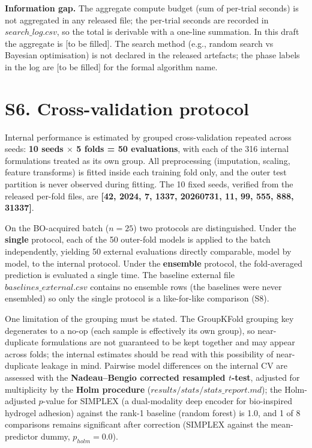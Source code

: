 \documentclass[utf8]{frontiers_suppmat}
\begin{document}
\textbf{Information gap.} The aggregate compute budget (sum of per-trial seconds) is not aggregated in any released file; the per-trial seconds are recorded in $search\_log.csv$, so the total is derivable with a one-line summation. In this draft the aggregate is {[}to be filled{]}. The search method (e.g., random search vs Bayesian optimisation) is not declared in the released artefacts; the phase labels in the log are {[}to be filled{]} for the formal algorithm name.

\section{S6. Cross-validation protocol}

Internal performance is estimated by grouped cross-validation repeated across seeds: \textbf{10 seeds $\times$ 5 folds = 50 evaluations}, with each of the 316 internal formulations treated as its own group. All preprocessing (imputation, scaling, feature transforms) is fitted inside each training fold only, and the outer test partition is never observed during fitting. The 10 fixed seeds, verified from the released per-fold files, are \textbf{[42, 2024, 7, 1337, 20260731, 11, 99, 555, 888, 31337]}.

On the BO-acquired batch ($n = 25$) two protocols are distinguished. Under the \textbf{single} protocol, each of the 50 outer-fold models is applied to the batch independently, yielding 50 external evaluations directly comparable, model by model, to the internal protocol. Under the \textbf{ensemble} protocol, the fold-averaged prediction is evaluated a single time. The baseline external file $baselines\_external.csv$ contains no ensemble rows (the baselines were never ensembled) so only the single protocol is a like-for-like comparison (S8).

One limitation of the grouping must be stated. The GroupKFold grouping key degenerates to a no-op (each sample is effectively its own group), so near-duplicate formulations are not guaranteed to be kept together and may appear across folds; the internal estimates should be read with this possibility of near-duplicate leakage in mind. Pairwise model differences on the internal CV are assessed with the \textbf{Nadeau--Bengio corrected resampled $t$-test}, adjusted for multiplicity by the \textbf{Holm procedure} ($results/stats/stats\_report.md$); the Holm-adjusted $p$-value for SIMPLEX (a dual-modality deep encoder for bio-inspired hydrogel adhesion) against the rank-1 baseline (random forest) is 1.0, and 1 of 8 comparisons remains significant after correction (SIMPLEX against the mean-predictor dummy, $p_{holm} = 0.0$).
\end{document}
